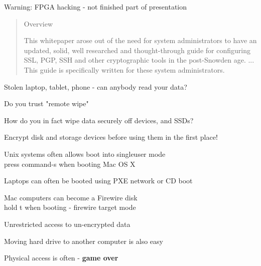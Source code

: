 \documentclass[20pt,landscape,a4paper,footrule]{foils}
\begin{document}
Warning: FPGA hacking - not finished part of presentation






\begin{quote}
Overview

This whitepaper arose out of the need for system administrators to have an updated, solid, well researched and thought-through guide for configuring SSL, PGP, SSH and other cryptographic tools in the post-Snowden age. ... This guide is specifically written for these system administrators. 
\end{quote}





\begin{list1}
\item Stolen laptop, tablet, phone - can anybody read your data?
\item Do you trust "remote wipe"
\item How do you in fact wipe data securely off devices, and SSDs?
\item Encrypt disk and storage devices before using them in the first place!
\end{list1}


\begin{list1}
\item Unix systems often allows boot into singleuser mode\\
press command-s when booting Mac OS X 
\item Laptops can often be booted using PXE network or CD boot
\item Mac computers can become a Firewire disk\\
hold t when booting - firewire target mode
\item Unrestricted access to un-encrypted data
\item Moving hard drive to another computer is also easy
\end{list1}
\pause
\centerline{Physical access is often - {\bf game over}}
\end{document}
